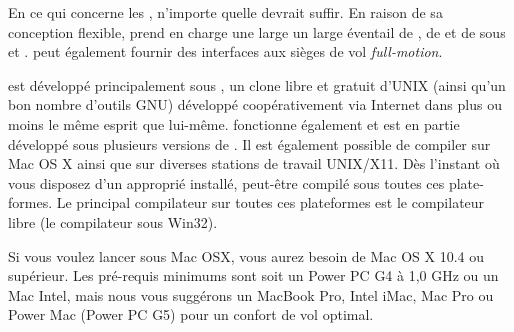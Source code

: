 {En ce qui concerne les , n'importe quelle  devrait suffir. En raison de sa
conception flexible, \FlightGear{} prend en charge une large un large \'{e}ventail de , de
 et de  sous  et .
\FlightGear{} peut \'{e}galement fournir des interfaces aux si\`{e}ges de vol \textit{full-motion}.

\FlightGear{} est d\'{e}velopp\'{e} principalement sous , un clone libre et gratuit d'UNIX
(ainsi qu'un bon nombre d'outils GNU) d\'{e}velopp\'{e} coop\'{e}rativement via Internet dans plus ou moins
le m\^{e}me esprit que \FlightGear{} lui-m\^{e}me. \FlightGear{} fonctionne \'{e}galement et est en partie d\'{e}velopp\'{e}
sous plusieurs versions de . Il est \'{e}galement possible de compiler \FlightGear{} sur Mac OS X
ainsi que sur diverses stations de travail UNIX/X11. D\`{e}s l'instant o\`{u} vous disposez d'un  appropri\'{e}
install\'{e}, \FlightGear{} peut-\^{e}tre compil\'{e} sous toutes ces plate-formes. Le principal compilateur sur toutes ces plateformes
est le compilateur libre  (le compilateur   sous Win32).

Si vous voulez lancer \FlightGear{} sous Mac OSX, vous aurez besoin de Mac OS X 10.4 ou sup\'{e}rieur. Les pr\'{e}-requis minimums
sont soit un Power PC G4 \`{a} 1,0 GHz ou un Mac Intel, mais nous vous sugg\'{e}rons un MacBook Pro,
Intel iMac, Mac Pro ou Power Mac (Power PC G5) pour un confort de vol optimal.
}{}
